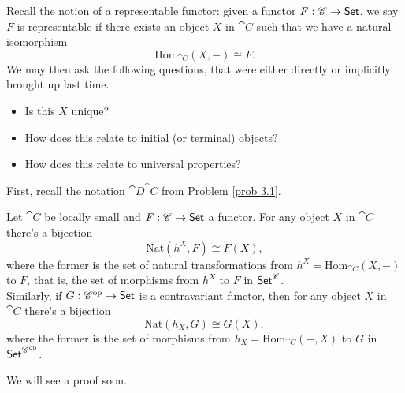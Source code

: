 \vspace*{1em}

Recall the notion of a representable functor: given a functor $F:\mathscr{C} \to \mathsf{Set}$, we say $F$ is representable if there exists an object $X$ in $\cat{C}$ such that we have a natural isomorphism
\[\mathrm{Hom}_{\cat{C}}(X,-) \cong F.\]
We may then ask the following questions, that were either directly or implicitly brought up last time.
\begin{itemize}
\item Is this $X$ unique?
\item How does this relate to initial (or terminal) objects?
\item How does this relate to universal properties?
\end{itemize}
First, recall the notation $\cat{D}^\cat{C}$ from Problem \ref{prob 3.1}.

\vspace*{0.1in}

\begin{theorem}\label{yoneda}
Let $\cat{C}$ be locally small and $F:\mathscr{C} \to \mathsf{Set}$ a functor. For any object $X$ in $\cat{C}$ there's a bijection
\[\mathrm{Nat}(h^X,F) \cong F(X),\]
where the former is the set of natural transformations from $h^X = \mathrm{Hom}_{\cat{C}}(X,-)$ to $F$, that is, the set of morphisms from $h^X$ to $F$ in $\mathsf{Set}^{\mathscr{C}}$.\\[0.5em]
Similarly, if $G:\mathscr{C}^{\text{op}} \to \mathsf{Set}$ is a contravariant functor, then for any object $X$ in $\cat{C}$ there's a bijection
\[\mathrm{Nat}(h_X,G) \cong G(X),\]
where the former is the set of morphisms from $h_X = \mathrm{Hom}_{\cat{C}}(-,X)$ to $G$ in $\mathsf{Set}^{\mathscr{C}^{\text{op}}}$.
\end{theorem}
We will see a proof soon.

\vspace*{0.1in}

